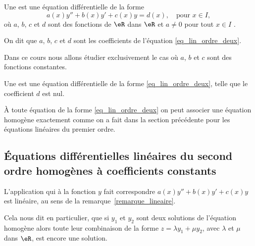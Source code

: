 \begin{definition}
	Une   est une équation différentielle de la forme
	\begin{equation}\label{eq_lin_ordre_deux}
		a(x)y'' + b(x) y' + c(x)y = d(x), \quad\text{pour } x\in I,
	\end{equation}
	o\`u \( a\), \( b\), \( c\) et \( d\) sont des fonctions de \( \eR\) dans \( \eR\) et \( a\neq 0\) pour tout \( x\in I\) .

	On dit que \( a\), \( b\), \( c\) et \( d\) sont les coefficients de l'équation \eqref{eq_lin_ordre_deux}.
\end{definition}
Dans ce cours nous allons étudier exclusivement le cas où \( a\), \( b\) et \( c\) sont des fonctions constantes.
\begin{definition}
	Une   est une équation différentielle de la forme \eqref{eq_lin_ordre_deux}, telle que le coefficient \( d\) est nul.
\end{definition}
À toute équation de la forme \eqref{eq_lin_ordre_deux} on peut associer une équation homogène exactement comme on a fait dans la section précédente pour les équations linéaires du premier ordre.

\subsection{Équations différentielles linéaires du second ordre homogènes à coefficients constants}

\begin{remark}
	L'application qui à la fonction \( y\) fait correspondre \( a(x)y'' + b(x) y' + c(x)y\) est linéaire, au sens de la remarque~\ref{remarque_lineaire}.

	Cela nous dit en particulier, que si \( y_1\) et \( y_2\) sont deux solutions de l'équation homogène alors toute leur combinaison de la forme \( z = \lambda y_1 + \mu y_2\), avec \( \lambda\) et \( \mu\) dans \( \eR\), est encore une solution.
\end{remark}

